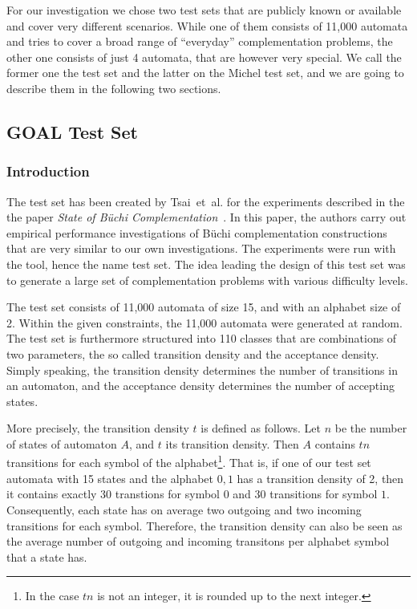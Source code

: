 For our investigation we chose two test sets that are publicly known or available and cover very different scenarios. While one of them consists of 11,000 automata and tries to cover a broad range of ``everyday'' complementation problems, the other one consists of just 4 automata, that are however very special. We call the former one the \goal{} test set and the latter on the Michel test set, and we are going to describe them in the following two sections.


\subsection{GOAL Test Set}
\label{4_goal_testset}

\subsubsection{Introduction}
The \goal{} test set has been created by Tsai~et~al. for the experiments described in the the paper \textit{State of Büchi Complementation}~\cite{2010_tsai}. In this paper, the authors carry out empirical performance investigations of Büchi complementation constructions that are very similar to our own investigations. The experiments were run with the \goal{} tool, hence the name \goal{} test set. The idea leading the design of this test set was to generate a large set of complementation problems with various difficulty levels.

The test set consists of 11,000 automata of size 15, and with an alphabet size of 2. Within the given constraints, the 11,000 automata were generated at random. The test set is furthermore structured into 110 classes that are combinations of two parameters, the so called transition density and the acceptance density. Simply speaking, the transition density determines the number of transitions in an automaton, and the acceptance density determines the number of accepting states.

More precisely, the transition density $t$ is defined as follows. Let $n$ be the number of states of automaton $A$, and $t$ its transition density. Then $A$ contains $tn$ transitions for each symbol of the alphabet\footnote{In the case $tn$ is not an integer, it is rounded up to the next integer.}. That is, if one of our test set automata with 15 states and the alphabet ${0, 1}$ has a transition density of 2, then it contains exactly 30 transtions for symbol $0$ and 30 transitions for symbol $1$. Consequently, each state has on average two outgoing and two incoming transitions for each symbol. Therefore, the transition density can also be seen as the average number of outgoing and incoming transitons per alphabet symbol that a state has.


